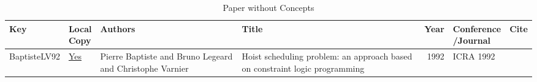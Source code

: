{\scriptsize
\begin{longtable}{llp{5cm}p{10cm}rp{3cm}l}
\caption{Paper without Concepts}\\ \toprule
Key & \shortstack{Local\\Copy} & Authors & Title & Year & \shortstack{Conference\\/Journal} & Cite\\ \midrule
\endhead
\bottomrule
\endfoot
BaptisteLV92 & \href{papers/BaptisteLV92.pdf}{Yes} & Pierre Baptiste and Bruno Legeard and Christophe Varnier & Hoist scheduling problem: an approach based on constraint logic programming & 1992 & ICRA 1992 & \cite{BaptisteLV92}\\\end{longtable}
}

